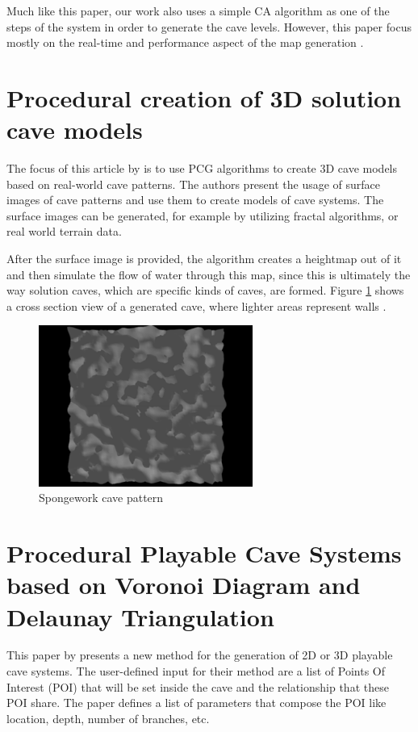 Much like this paper, our work also uses a simple CA algorithm as one of the steps of the system in order to generate the cave levels. However, this paper focus mostly on the real-time and performance aspect of the map generation \cite{johnson:2010}.

\section{Procedural creation of 3D solution cave models}

The focus of this article by \textcite{boggus:2009} is to use PCG algorithms to create 3D cave models based on real-world cave patterns. The authors present the usage of surface images of cave patterns and use them to create models of cave systems. The surface images can be generated, for example by utilizing fractal algorithms, or real world terrain data.

After the surface image is provided, the algorithm creates a heightmap out of it and then simulate the flow of water through this map, since this is ultimately the way solution caves, which are specific kinds of caves, are formed. Figure \ref{fig:3d_cave} shows a cross section view of a generated cave, where lighter areas represent walls \citeyear{boggus:2009}.
\begin{figure}[h]
    \caption{Spongework cave pattern}
    \centerline{\includegraphics[width=7cm]{images/related_work/3d_cave.png}}
    \label{fig:3d_cave}
\end{figure}

\section{Procedural Playable Cave Systems
based on Voronoi Diagram and Delaunay Triangulation}

This paper by \textcite{santamaria:2014} presents a new method for the generation of 2D or 3D playable cave systems. The user-defined input for their method are a list of Points Of Interest (POI) that will be set inside the cave and the relationship that these POI share. The paper defines a list of parameters that compose the POI like location, depth, number of branches, etc.

